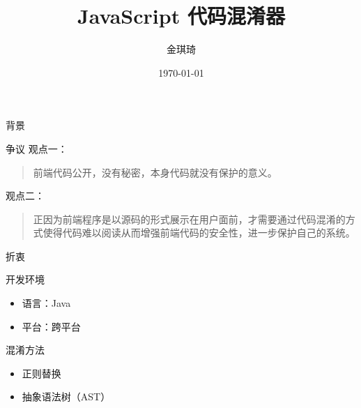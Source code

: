 \documentclass[presentation]{beamer}
\author{金琪琦}
\date{\today}
\title{JavaScript 代码混淆器}
\begin{document}
\maketitle

\begin{frame}[label=sec-1]{背景}
\end{frame}
\begin{frame}[label=sec-2]{争议}
观点一：
\begin{quote}
前端代码公开，没有秘密，本身代码就没有保护的意义。
\end{quote}
观点二：
\begin{quote}
正因为前端程序是以源码的形式展示在用户面前，才需要通过代码混淆的方式使得代码难以阅读从而增强前端代码的安全性，进一步保护自己的系统。
\end{quote}
\end{frame}
\begin{frame}[label=sec-3]{折衷}
\end{frame}
\begin{frame}[label=sec-4]{开发环境}
\begin{itemize}
\item 语言：Java
\item 平台：跨平台
\end{itemize}
\end{frame}
\begin{frame}[label=sec-5]{混淆方法}
\begin{itemize}
\item 正则替换
\item 抽象语法树（AST）
\end{itemize}
\end{frame}
\end{document}
